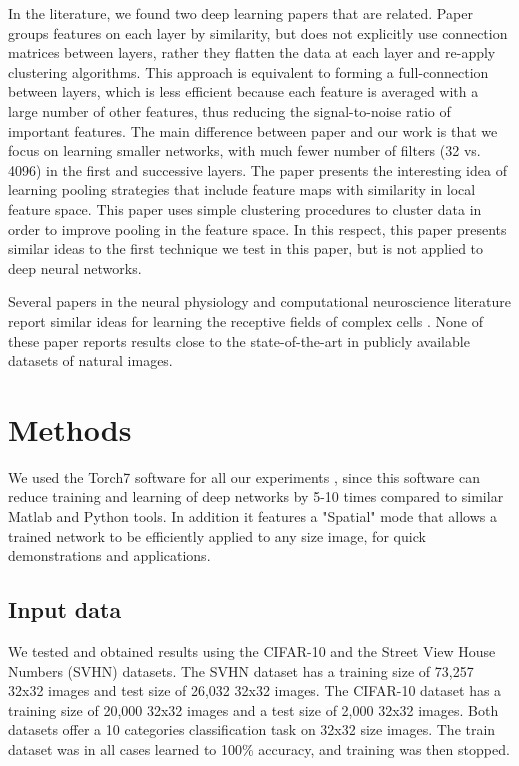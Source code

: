 \documentclass{article} %
\begin{document}
In the literature, we found two deep learning papers that are related. 
Paper \cite{coates2012learning} groups features on each layer by similarity, but does not explicitly use connection matrices between layers, 
rather they flatten the data at each layer and re-apply clustering algorithms. 
This approach is equivalent to forming a full-connection between layers, 
which is less efficient because each feature is averaged with a large number of other features, thus reducing the signal-to-noise ratio of important features.
The main difference between paper \cite{coates2012learning} and our work is that we focus on learning smaller networks,
with much fewer number of filters (32 vs. 4096) in the first and successive layers. 
The paper \cite{boureau_2011} presents the interesting idea of learning pooling strategies that include feature maps with similarity in local feature space. 
This paper uses simple clustering procedures to cluster data in order to improve pooling in the feature space. 
In this respect, this paper presents similar ideas to the first technique we test in this paper, but is not applied to deep neural networks.

Several papers in the neural physiology and computational neuroscience literature report similar ideas for learning the receptive fields of complex cells \cite{masquelier2007learning,spratling2005learning,wiskott2002slow,wallis1997invariant}. None of these paper reports results close to the state-of-the-art in publicly available datasets of natural images.




\section{Methods}
\label{sec-methods}

We used the Torch7 software for all our experiments \cite{collobert_torch7_2011}, since this software can reduce training and learning of deep networks
by 5-10 times compared to similar Matlab and Python tools.
In addition it features a "Spatial" mode that allows a trained network to be efficiently applied to any size image, for quick demonstrations and applications.


\subsection{Input data}

We tested and obtained results using the CIFAR-10 \cite{krizhevsky_learning_2009} and the Street View House Numbers (SVHN) \cite{netzer_reading_2011} datasets.
The SVHN dataset has a training size of 73,257 32x32 images and test size of 26,032 32x32 images.
The CIFAR-10 dataset has a training size of 20,000 32x32 images and a test size of 2,000 32x32 images.
Both datasets offer a 10 categories classification task on 32x32 size images.
The train dataset was in all cases learned to 100\% accuracy, and training was then stopped. 
\end{document}
